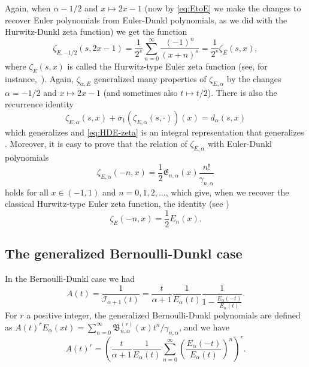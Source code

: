 \documentclass[a4paper]{amsart}
\newcommand{\I}{\mathcal{I}}
\newcommand{\Ea}{E_{\alpha}}
\newcommand{\cc}{\gamma}
\newcommand{\B}{\mathfrak{B}}
\newcommand{\E}{\mathfrak{E}}
\theoremstyle{plain}
\theoremstyle{definition}
\theoremstyle{remark}
\numberwithin{equation}{section}
\begin{document}
Again, when $\alpha -1/2$ and $x \mapsto 2x-1$ (now by \eqref{eq:EtoE} we make the changes to recover Euler polynomials from Euler-Dunkl polynomials, as we did with the Hurwitz-Dunkl zeta function) we get the function
\begin{equation*}
\zeta_{E,-1/2}(s,2x-1) = \frac{1}{2^s} \sum_{n=0}^{\infty}
\frac{(-1)^n}{(x+n)^s} = \frac{1}{2^s} \zeta_{E}(s,x),
\end{equation*}
where $\zeta_{E}(s,x)$ is called the Hurwitz-type Euler zeta function (see, for instance,~\cite{SuHu}). Again, $\zeta_{\alpha,E}$ generalized many properties of $\zeta_{E,\alpha}$ by the changes $\alpha = -1/2$ and $x\mapsto 2x-1$ (and sometimes also $t \mapsto t/2$). There is also the recurrence identity 
\[
\zeta_{E,\alpha}(s,x) + \sigma_1(\zeta_{E,\alpha}(s,\cdot))(x) = d_{\alpha}(s,x)
\] 
which generalizes \cite[(2.1)]{SuHu} and \eqref{eq:HDE-zeta} is an integral representation that generalizes \cite[(3.1)]{WiZ}. Moreover, it is easy to prove that the relation of $\zeta_{E,\alpha}$ with Euler-Dunkl polynomials
\begin{equation*}
    \zeta_{E,\alpha}(-n,x) = \frac{1}{2}\E_{n,\alpha}(x)  \frac{n!}{\gamma_{n,\alpha}}
\end{equation*}
holds for all $x \in (-1,1)$ and $n=0,1,2,\dots$, which give, when we recover the classical Hurwitz-type Euler zeta function, the identity (see \cite[(2.7)]{SuHu})
\begin{equation*}
\zeta_{E}(-n,x) = \frac{1}{2} E_n(x).
\end{equation*}


\subsection{The generalized Bernoulli-Dunkl case}

In the Bernoulli-Dunkl case we had
\[
 A(t) = \frac{1}{\I_{\alpha+1}(t)} 
 = \frac{t}{\alpha+1} \frac{1}{\Ea(t)}\frac{1}{1 - \frac{\Ea(-t)}{\Ea(t)}}.
\]
For $r$ a positive integer, the generalized Bernoulli-Dunkl polynomials are defined as $A(t)^r E_\alpha(xt) = \sum_{n=0}^{\infty} \B_{n,\alpha}^{(r)}(x)t^n/\cc_{n,\alpha}$, and we have
\[
A(t)^r = \left( \frac{t}{\alpha+1}\frac{1}{\Ea(t)}
\sum_{n=0}^{\infty} \left(\frac{\Ea(-t)}{\Ea(t)}\right)^n\right)^r.
\]
\end{document}
